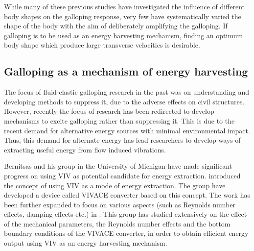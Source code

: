 While many of these previous studies have investigated the influence of different body shapes on the galloping response, very few have systematically varied the shape of the body with the aim of deliberately amplifying the galloping. If galloping is to be used as an energy harvesting mechanism, finding an optimum body shape which produce large transverse velocities is desirable.


\subsection{Galloping as a mechanism of energy harvesting}

The focus of fluid-elastic galloping research in the past was on understanding and developing methods to suppress it, due to the adverse effects on civil structures. However, recently the focus of research has been redirected to develop mechanisms to excite galloping rather than suppressing it. This is due to the recent demand for alternative energy sources with minimal environmental impact. Thus, this demand for alternate energy has lead researchers to develop ways of extracting useful energy from flow induced vibrations.

Bernitsas and his group in the University of Michigan have made significant progress on using VIV as potential candidate for energy extraction. \cite{Bernitsas2008a-concept} introduced the concept of using VIV as a mode of energy extraction. The group have developed a device called VIVACE converter based on this concept. The work has been further expanded to focus on various aspects (such as Reynolds number effects, damping effects etc.) in \citet{Bernitsas2009,Raghavan2009,Raghavan2010a,Lee2011a}. This group has studied extensively on the effect of the mechanical parameters, the Reynolds number effects and the bottom boundary conditions of the VIVACE converter, in order to obtain efficient energy output using VIV as an energy harvesting mechanism. 

